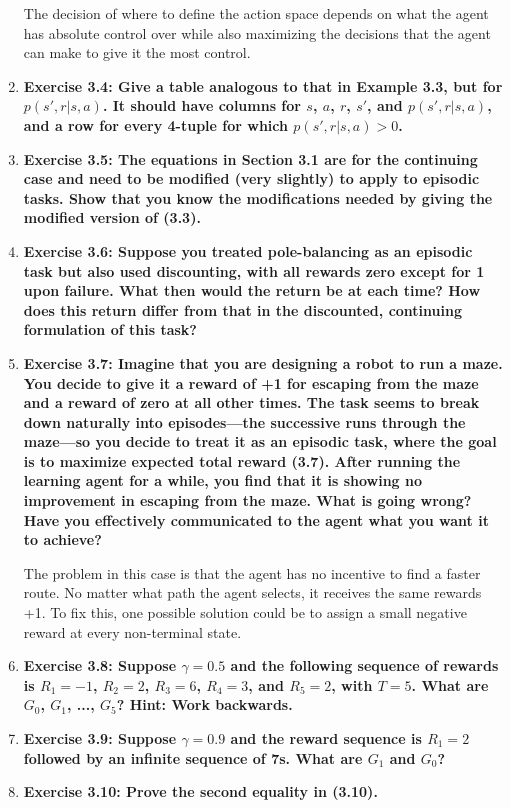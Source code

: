 \documentclass[11pt]{article}
\begin{document}
\begin{enumerate}
		The decision of where to define the action space depends on what the agent has absolute control over while also maximizing the decisions that the agent can make to give it
		the most control.
		
		\item \textbf{Exercise 3.4: Give a table analogous to that in Example 3.3, but for $p(s',r|s,a)$. It should have columns for $s$, $a$, $r$, $s'$, and $p(s',r|s,a)$, and a
		row for every 4-tuple for which $p(s',r|s,a) > 0$.}
		
		\item \textbf{Exercise 3.5: The equations in Section 3.1 are for the continuing case and need to be modified (very slightly) to apply to episodic tasks. Show that you know
		the modifications needed by giving the modified version of (3.3).}
		
		\item \textbf{Exercise 3.6: Suppose you treated pole-balancing as an episodic task but also used discounting, with all rewards zero except for 1 upon failure. What then
		would the return be at each time? How does this return differ from that in the discounted, continuing formulation of this task?}
		
		\item \textbf{Exercise 3.7: Imagine that you are designing a robot to run a maze. You decide to give it a reward of +1 for escaping from the maze and a reward of zero at
		all other times. The task seems to break down naturally into episodes—the successive runs through the maze—so you decide to treat it as an episodic task, where the goal is
		to maximize expected total reward (3.7). After running the learning agent for a while, you find that it is showing no improvement in escaping from the maze. What is going
		wrong? Have you effectively communicated to the agent what you want it to achieve?}
		
		The problem in this case is that the agent has no incentive to find a faster route. No matter what path the agent selects, it receives the same rewards +1. To fix this, one
		possible solution could be to assign a small negative reward at every non-terminal state.
		
		\item \textbf{Exercise 3.8: Suppose $\gamma=0.5$ and the following sequence of rewards is $R_1=-1$, $R_2=2$, $R_3=6$, $R_4=3$, and $R_5=2$, with $T=5$. What are $G_0$,
		$G_1$, ..., $G_5$? Hint: Work backwards.}
		
		\item \textbf{Exercise 3.9: Suppose $\gamma=0.9$ and the reward sequence is $R_1=2$ followed by an infinite sequence of 7s. What are $G_1$ and $G_0$?}
		
		\item \textbf{Exercise 3.10: Prove the second equality in (3.10).}
	
	\end{enumerate}
\end{document}
